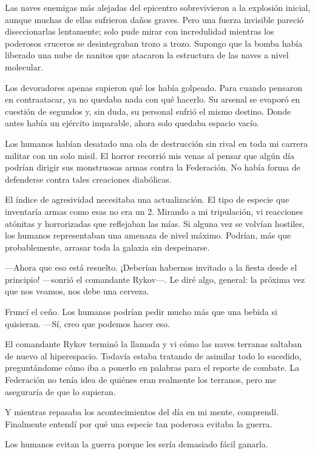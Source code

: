 Las naves enemigas más alejadas del epicentro sobrevivieron a la explosión inicial, aunque muchas de ellas sufrieron daños graves. Pero una fuerza invisible pareció diseccionarlas lentamente; solo pude mirar con incredulidad mientras los poderosos cruceros se desintegraban trozo a trozo. Supongo que la bomba había liberado una nube de nanitos que atacaron la estructura de las naves a nivel molecular.

Los devoradores apenas supieron qué los había golpeado. Para cuando pensaron en contraatacar, ya no quedaba nada con qué hacerlo. Su arsenal se evaporó en cuestión de segundos y, sin duda, su personal sufrió el mismo destino. Donde antes había un ejército imparable, ahora solo quedaba espacio vacío.

Los humanos habían desatado una ola de destrucción sin rival en toda mi carrera militar con un solo misil. El horror recorrió mis venas al pensar que algún día podrían dirigir sus monstruosas armas contra la Federación. No había forma de defenderse contra tales creaciones diabólicas.

El índice de agresividad necesitaba una actualización. El tipo de especie que inventaría armas como esas no era un 2. Mirando a mi tripulación, vi reacciones atónitas y horrorizadas que reflejaban las mías. Si alguna vez se volvían hostiles, los humanos representaban una amenaza de nivel máximo. Podrían, más que probablemente, arrasar toda la galaxia sin despeinarse.

—Ahora que eso está resuelto. ¡Deberían habernos invitado a la fiesta desde el principio! —sonrió el comandante Rykov—. Le diré algo, general: la próxima vez que nos veamos, nos debe una cerveza.

Fruncí el ceño. Los humanos podrían pedir mucho más que una bebida si quisieran. —Sí, creo que podemos hacer eso.

El comandante Rykov terminó la llamada y vi cómo las naves terranas saltaban de nuevo al hiperespacio. Todavía estaba tratando de asimilar todo lo sucedido, preguntándome cómo iba a ponerlo en palabras para el reporte de combate. La Federación no tenía idea de quiénes eran realmente los terranos, pero me aseguraría de que lo supieran.

Y mientras repasaba los acontecimientos del día en mi mente, comprendí. Finalmente entendí por qué una especie tan poderosa evitaba la guerra.

Los humanos evitan la guerra porque les sería demasiado fácil ganarla.